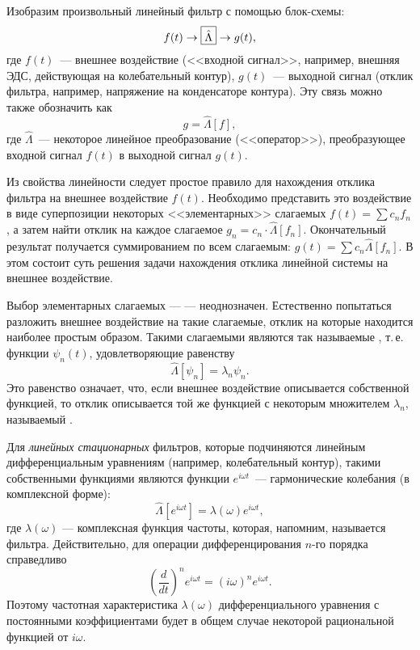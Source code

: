 Изобразим произвольный линейный фильтр с помощью блок-схемы:
\begin{equation*}
f(t)\to\fbox{$\hat\Lambda$} \to g(t),
\end{equation*}
где $f(t)$~--- внешнее воздействие (<<входной сигнал>>, например, внешняя
ЭДС, действующая на колебательный контур), $g(t)$~--- выходной сигнал
(отклик фильтра, например, напряжение на конденсаторе контура).
Эту связь можно также обозначить как
\begin{equation*}
g=\hat\Lambda [f],
\end{equation*}
где $\hat\Lambda$~--- некоторое линейное преобразование (<<оператор>>),
преобразующее входной сигнал $f(t)$ в выходной сигнал $g(t)$.

Из свойства линейности следует простое правило для нахождения
отклика фильтра на  внешнее воздействие $f(t)$.
Необходимо представить это воздействие в виде суперпозиции некоторых
<<элементарных>> слагаемых $f(t)=\sum c_n f_n$, а затем найти отклик на каждое
слагаемое $g_n = c_n \cdot \hat \Lambda [f_n]$. Окончательный результат
получается суммированием по всем слагаемым: $g(t)=\sum c_n \hat\Lambda [f_n]$.
В этом состоит суть  решения задачи
нахождения отклика линейной системы на внешнее воздействие.

Выбор элементарных слагаемых ---  --- неоднозначен.
Естественно попытаться разложить внешнее воздействие на такие
слагаемые, отклик на которые находится наиболее простым образом. Такими
слагаемыми являются так называемые
, т.\,е. функции $\psi_n(t)$,
удовлетворяющие равенству
\begin{equation}
    \hat \Lambda[\psi_n]=\lambda_n \psi_n.
\end{equation}
Это равенство означает, что, если внешнее воздействие описывается собственной
функцией, то отклик описывается той же функцией с некоторым множителем
$\lambda_n$, называемый .

Для \emph{линейных стационарных} фильтров, которые подчиняются линейным
дифференциальным уравнениям (например, колебательный контур),
такими собственными функциями являются функции $e^{i\omega t}$~--- гармонические
колебания (в комплексной форме):
\begin{equation*}
\hat\Lambda\left[e^{i\omega t}\right]=\lambda(\omega)e^{i\omega t},
\end{equation*}
где $\lambda(\omega)$ --- комплексная функция частоты, которая, напомним,
называется  фильтра.
Действительно, для операции дифференцирования $n$-го порядка справедливо
\[
\left(\frac{d}{dt}\right)^n e^{i\omega t} = (i\omega)^n e^{i\omega t}.
\]
Поэтому частотная характеристика $\lambda(\omega)$ дифференциального уравнения
с постоянными коэффициентами будет в общем случае некоторой рациональной
функцией от $i\omega$.

